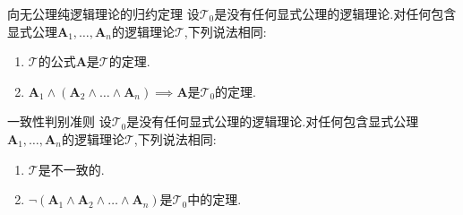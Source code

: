 \begin{metatheorem}{向无公理纯逻辑理论的归约定理}{}
	设$\mathcal{T}_{0}$是没有任何显式公理的逻辑理论.对任何包含显式公理$\boldsymbol{A}_{1},\ldots,\boldsymbol{A}_{n}$的逻辑理论$\mathcal{T}$,下列说法相同:
	\begin{enumerate}
		\item $\mathcal{T}$的公式$\boldsymbol{A}$是$\mathcal{T}$的定理.
		\item $\boldsymbol{A}_{1}\wedge\left(\boldsymbol{A}_{2}\wedge\ldots\wedge\boldsymbol{A}_{n}\right)\implies\boldsymbol{A}$是$\mathcal{T}_{0}$的定理.
	\end{enumerate}
\end{metatheorem}

\begin{metatheorem}{一致性判别准则}{}
	设$\mathcal{T}_{0}$是没有任何显式公理的逻辑理论.对任何包含显式公理$\boldsymbol{A}_{1},\ldots,\boldsymbol{A}_{n}$的逻辑理论$\mathcal{T}$,下列说法相同:
	\begin{enumerate}
		\item $\mathcal{T}$是不一致的.
		\item $\neg\left(\boldsymbol{A}_{1}\wedge\boldsymbol{A}_{2}\wedge\ldots\wedge\boldsymbol{A}_{n}\right)$是$\mathcal{T}_{0}$中的定理.
	\end{enumerate}
\end{metatheorem}